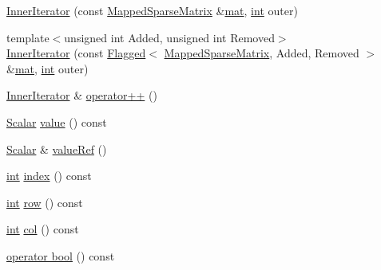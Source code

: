\begin{DoxyCompactItemize}
\item 
\hyperlink{class_mapped_sparse_matrix_1_1_inner_iterator_adebae45c6bdd2e3fa820cd575ed5784e}{Inner\-Iterator} (const \hyperlink{class_mapped_sparse_matrix}{Mapped\-Sparse\-Matrix} \&\hyperlink{uavobjecttemplate_8m_a16a51e808b16c46bbfd36da2e37cd123}{mat}, \hyperlink{ioapi_8h_a787fa3cf048117ba7123753c1e74fcd6}{int} outer)
\item 
{\footnotesize template$<$unsigned int Added, unsigned int Removed$>$ }\\\hyperlink{class_mapped_sparse_matrix_1_1_inner_iterator_a5b087d7566acd96e0a1dde7c43bb007d}{Inner\-Iterator} (const \hyperlink{class_flagged}{Flagged}$<$ \hyperlink{class_mapped_sparse_matrix}{Mapped\-Sparse\-Matrix}, Added, Removed $>$ \&\hyperlink{uavobjecttemplate_8m_a16a51e808b16c46bbfd36da2e37cd123}{mat}, \hyperlink{ioapi_8h_a787fa3cf048117ba7123753c1e74fcd6}{int} outer)
\item 
\hyperlink{class_mapped_sparse_matrix_1_1_inner_iterator}{Inner\-Iterator} \& \hyperlink{class_mapped_sparse_matrix_1_1_inner_iterator_a809c69d26b558c495be8ffd954a6791a}{operator++} ()
\item 
\hyperlink{class_sparse_matrix_base_af39d70f2b7e775e9e17b666cd24128c8}{Scalar} \hyperlink{class_mapped_sparse_matrix_1_1_inner_iterator_a6a66f415196389183a568ec00dc5136b}{value} () const 
\item 
\hyperlink{class_sparse_matrix_base_af39d70f2b7e775e9e17b666cd24128c8}{Scalar} \& \hyperlink{class_mapped_sparse_matrix_1_1_inner_iterator_a9481869df307f75ec1f3216d07f1fc0e}{value\-Ref} ()
\item 
\hyperlink{ioapi_8h_a787fa3cf048117ba7123753c1e74fcd6}{int} \hyperlink{class_mapped_sparse_matrix_1_1_inner_iterator_a2c96886696556a4e8d286ad914f3c95d}{index} () const 
\item 
\hyperlink{ioapi_8h_a787fa3cf048117ba7123753c1e74fcd6}{int} \hyperlink{class_mapped_sparse_matrix_1_1_inner_iterator_af15523c43887f987b34c95abc4d0bc61}{row} () const 
\item 
\hyperlink{ioapi_8h_a787fa3cf048117ba7123753c1e74fcd6}{int} \hyperlink{class_mapped_sparse_matrix_1_1_inner_iterator_a6e7e314bf717f04332d22e584af84c58}{col} () const 
\item 
\hyperlink{class_mapped_sparse_matrix_1_1_inner_iterator_af4ff7bb077863442f5c99fb211498eb4}{operator bool} () const 
\end{DoxyCompactItemize}
